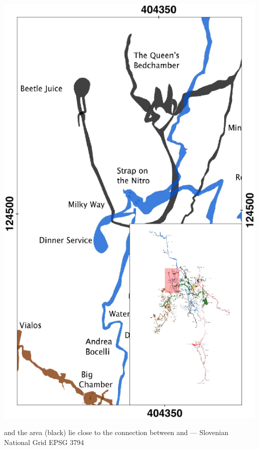 \begin{marginfigure}
\checkoddpage \ifoddpage \forcerectofloat \else \forceversofloat \fi
\centering
\includegraphics[width=\textwidth]{images/2013/tetley-sam-2013/beetlejuice_inset.pdf}
\caption{\protect{} and the \protect{} area (black) lie close to the connection between \protect{} and \protect{} --- Slovenian National Grid EPSG 3794 }
\label{small inset}
\end{marginfigure}

